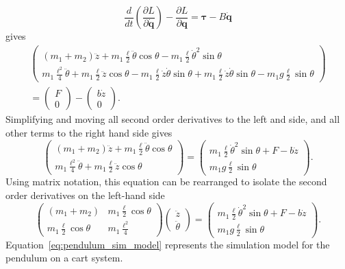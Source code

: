 \[
\frac{d}{dt}\left(\frac{\partial L}{\partial\dot{\mathbf{q}}} \right) - \frac{\partial L}{\partial \mathbf{q}} =  \boldsymbol{\tau}-B\dot{\mathbf{q}}
\]
gives
\begin{multline*}
\begin{pmatrix}
(m_1+m_2)\ddot{z} + m_1 \frac{\ell}{2} \ddot{\theta}\cos\theta - m_1 \frac{\ell}{2} \dot{\theta}^2\sin\theta \\
m_1 \frac{\ell^2}{4} \ddot{\theta} + m_1 \frac{\ell}{2} \ddot{z}\cos\theta - m_1 \frac{\ell}{2} \dot{z}\dot{\theta}\sin\theta + m_1\frac{\ell}{2}\dot{z}\dot{\theta}\sin\theta - m_1 g \frac{\ell}{2} \sin\theta
\end{pmatrix}
\\ = \begin{pmatrix} F \\ 0 \end{pmatrix}-\begin{pmatrix} b\dot{z} \\ 0 \end{pmatrix}.
\end{multline*}
Simplifying and moving all second order derivatives to the left and side, and all other terms to the right hand side gives
\[
\begin{pmatrix}
(m_1+m_2)\ddot{z} + m_1 \frac{\ell}{2} \ddot{\theta}\cos\theta  \\
m_1 \frac{\ell^2}{4} \ddot{\theta} + m_1 \frac{\ell}{2} \ddot{z}\cos\theta   
\end{pmatrix}
= \begin{pmatrix}  m_1 \frac{\ell}{2} \dot{\theta}^2\sin\theta + F -b\dot{z} \\ m_1 g \frac{\ell}{2} \sin\theta \end{pmatrix}.
\]
Using matrix notation, this equation can be rearranged to isolate the second order derivatives on the left-hand side
\begin{equation}\label{eq:pendulum_sim_model}
\begin{pmatrix}
(m_1+m_2) & m_1 \frac{\ell}{2} \cos\theta \\ 
m_1 \frac{\ell}{2} \cos\theta & m_1 \frac{\ell^2}{4}
\end{pmatrix} \begin{pmatrix}\ddot{z} \\ \ddot{\theta} \end{pmatrix}
= \begin{pmatrix}  m_1 \frac{\ell}{2} \dot{\theta}^2\sin\theta + F -b\dot{z} \\ m_1 g \frac{\ell}{2} \sin\theta \end{pmatrix}.
\end{equation}
Equation~\eqref{eq:pendulum_sim_model} represents the simulation model for the pendulum on a cart system.

